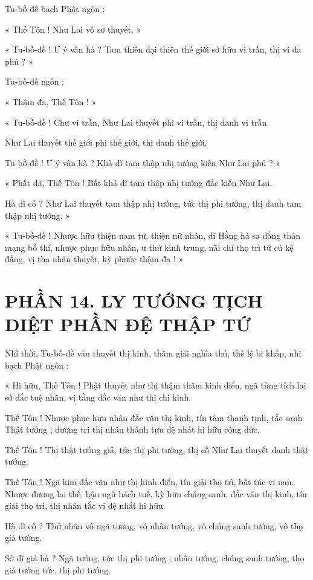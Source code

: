 	Tu-bồ-đề bạch Phật ngôn :
	
	« Thế Tôn ! Như Lai vô sở thuyết. »
	
	« Tu-bồ-đề ! Ư ý vân hà ? Tam thiên đại thiên thế giới sở hữu vi trần, thị vi đa phủ ? »
	
	Tu-bồ-đề ngôn :
	
	« Thậm đa, Thế Tôn ! »
	
	« Tu-bồ-đề ! Chư vi trần, Như Lai thuyết phi vi trần, thị danh vi trần. 
	
	Như Lai thuyết thế giới phi thế giới, thị danh thế giới. 
	
	Tu-bồ-đề ! Ư ý vân hà ? Khả dĩ tam thập nhị tướng kiến Như Lai phủ ? »
	
	« Phất dã, Thế Tôn ! Bất khả dĩ tam thập nhị tướng đắc kiến Như Lai. 
	
	Hà dĩ cố ? Như Lai thuyết tam thập nhị tướng, tức thị phi tướng, thị danh tam thập nhị tướng. »
	
	« Tu-bồ-đề ! Nhược hữu thiện nam tử, thiện nữ nhân, dĩ Hằng hà sa đẳng thân mạng bố thí, nhược phục hữu nhân, ư thử kinh trung, nãi chí thọ trì tứ cú kệ đẳng, vị tha nhân thuyết, kỳ phước thậm đa ! »
	
	\section*{PHẦN 14. LY TƯỚNG TỊCH DIỆT PHẦN ĐỆ THẬP TỨ}
	
	Nhĩ thời, Tu-bồ-đề văn thuyết thị kinh, thâm giải nghĩa thú, thế lệ bi khấp, nhi bạch Phật ngôn :
	
	« Hi hữu, Thế Tôn ! Phật thuyết như thị thậm thâm kinh điển, ngã tùng tích lai sở đắc tuệ nhãn, vị tằng đắc văn như thị chi kinh.
	
	Thế Tôn ! Nhược phục hữu nhân đắc văn thị kinh, tín tâm thanh tịnh, tắc sanh Thật tướng ; đương tri thị nhân thành tựu đệ nhất hi hữu công đức. 
	
	Thế Tôn ! Thị thật tướng giả, tức thị phi tướng, thị cố Như Lai thuyết danh thật tướng.
	
	Thế Tôn ! Ngã kim đắc văn như thị kinh điển, tín giải thọ trì, bất túc vi nan. Nhược đương lai thế, hậu ngũ bách tuế, kỳ hữu chúng sanh, đắc văn thị kinh, tín giải thọ trì, thị nhân tắc vi đệ nhất hi hữu. 
	
	Hà dĩ cố ? Thử nhân vô ngã tướng, vô nhân tướng, vô chúng sanh tướng, vô thọ giả tướng. 
	
	Sở dĩ giả hà ? Ngã tướng, tức thị phi tướng ; nhân tướng, chúng sanh tướng, thọ giả tướng tức, thị phi tướng. 
	
